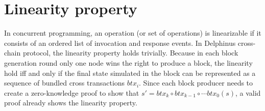 \documentclass[pageno]{jpaper}
\begin{document}
\section{Linearity property}
In concurrent programming, an operation (or set of operations) is linearizable if it consists of an ordered list of invocation and response events. In Delphinus cross-chain protocol, the linearity property holds trivially. Because in each block generation round only one node wins the right to produce a block, the linearity hold iff and only if the final state simulated in the block can be represented as a sequence of bundled cross transactions $btx_i$. Since each block producer needs to create a zero-knowledge proof to show that $s' = btx_k \circ btx_{k-1} \circ \cdots btx_0(s)$, a valid proof already shows the linearity property.



\end{document}
